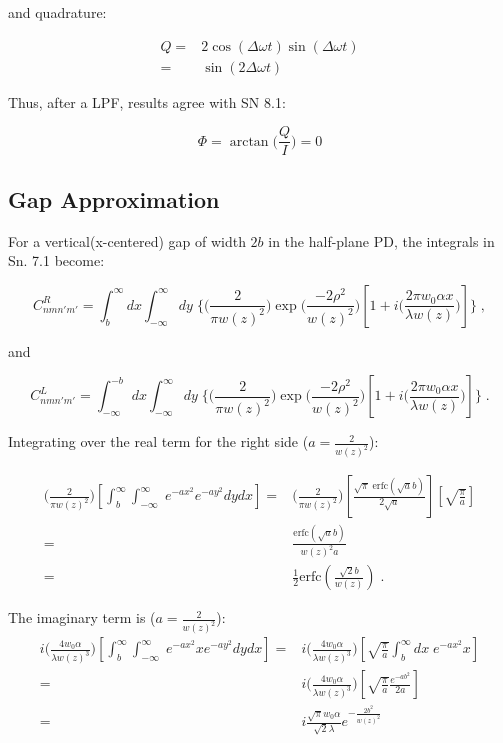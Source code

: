 \documentclass[aps,twoside,secnumarabic,balancelastpage,amsmath,amssymb,nofootinbib,hyperref=pdftex]{revtex4}
\newcommand{\bigfrac}[2]{\Big( \frac{#1}{#2}\Big)}
\begin{document}
and quadrature:

\begin{align*}
Q =& 2 \cos(\Delta \omega t) \sin (\Delta \omega t)
 \\=& \sin(2 \Delta \omega t)
\end{align*}

Thus, after a LPF, results agree with SN 8.1:

\begin{equation}
\Phi = \arctan \bigfrac{Q}{I} = 0
\end{equation}

\subsection{Gap Approximation}

For a vertical(x-centered) gap of width $2b$ in the half-plane PD, the integrals in Sn. 7.1 become:

\begin{equation}
C_{nmn'm'}^{R} = \int_{b}^{\infty} dx\int_{-\infty}^{\infty}  dy \;
\lbrace
	\bigfrac{2}{\pi w(z)^2}
	\exp \bigfrac{-2 \rho^2}{w(z)^{2}}	
	\left[
		1 
		+ 
		i  \bigfrac{ 2 \pi w_{0} \alpha x}{\lambda w(z)}		
	\right]
\rbrace
\;,
\end{equation}	

and

\begin{equation}
C_{nmn'm'}^{L} = \int_{-\infty}^{-b} dx\int_{-\infty}^{\infty}  dy \;
\lbrace
	\bigfrac{2}{\pi w(z)^2}
	\exp \bigfrac{-2 \rho^2}{w(z)^{2}}	
	\left[
		1 
		+ 
		i  \bigfrac{ 2 \pi w_{0} \alpha x}{\lambda w(z)}		
	\right]
\rbrace
\;.
\end{equation}	

Integrating over the real term for the right side ($a = \frac{2}{w(z)^2}$):

\begin{align*}
\bigfrac{2}{\pi w(z)^2}
\left[
\int_{b}^{\infty} \int_{-\infty}^{\infty}  \; e^{-a x^2} e^{-a y^2} dydx \right]
=&
 \bigfrac{2}{\pi w(z)^2}
 \left[ \frac{ \sqrt{\pi} \; \text{erfc}(\sqrt{a}b)}{2 \sqrt{a}} \right]
 \left[ \sqrt{\frac{\pi}{a} } \right]
 \\=& 
 \frac{\text{erfc}(\sqrt{a} b)} {w(z)^2 a}
 \\=&
 \frac{1} {2} \text{erfc}(\frac{\sqrt{2} b}{w(z)})
\;.
\end{align*}

The imaginary term is ($a = \frac{2}{w(z)^2}$):
\begin{align*}
i  \bigfrac{ 4 w_{0} \alpha}{\lambda w(z)^3}
		\left[
		\int_{b}^{\infty} \int_{-\infty}^{\infty}  \; e^{-a 		x^2}x e^{-a y^2} dydx \right]
=&
	i  \bigfrac{ 4 w_{0} \alpha}{\lambda w(z)^3}
	\left[
	\sqrt{\frac{\pi}{a}}
\int_{b}^{\infty} dx\; e^{-a x^2}x
\right]
\\=&
i  \bigfrac{ 4 w_{0} \alpha}{\lambda w(z)^3}
\left[
	\sqrt{\frac{\pi}{a}}
	\frac{e^{-ab^2}}{2a}
\right]
\\=&
	i \frac{\sqrt{\pi}w_0 \alpha }{\sqrt{2} \lambda} e^{-\frac{2 b^2}{w(z)^2}}
\end{align*}
\end{document}
